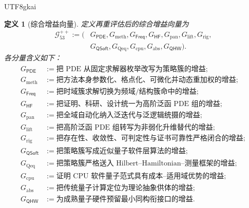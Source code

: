 \documentclass[12pt]{article}
\newtheorem{definition}{定义}[section]
\newcommand{\PDE}{\mathsf{PDE}}
\newcommand{\Freq}{\mathsf{Freq}}
\newcommand{\HF}{\mathsf{HF}}
\newcommand{\QSoft}{\mathsf{QSoft}}
\newcommand{\QHW}{\mathsf{QHW}}
\begin{document}
\begin{CJK*}{UTF8}{gkai}
\begin{definition}[综合增益向量]
定义再重评估后的综合增益向量为
\[
  \begin{aligned}
  \mathcal G_{53}^{++}
  :=
  (&
    G_{\PDE},
    G_{\mathrm{meth}},
    G_{\Freq},
    G_{\HF},
    G_{\mathrm{pan}},
    G_{\mathrm{lift}},
    G_{\mathrm{rig}},\\
   &
    G_{\QSoft},
    G_{\mathrm{Qeq}},
    G_{\mathrm{cpu}},
    G_{\mathrm{abs}},
    G_{\QHW}
  ).
  \end{aligned}
\]
各分量含义如下：
\[
\begin{aligned}
  G_{\PDE}
  &:=
  \text{把 PDE 从固定求解器枚举改写为策略簇的增益};\\
  G_{\mathrm{meth}}
  &:=
  \text{把方法本身参数化、格点化、可微化并动态重加权的增益};\\
  G_{\Freq}
  &:=
  \text{把时域簇求解切换为频域/结构簇命中的增益};\\
  G_{\HF}
  &:=
  \text{把证明、科研、设计统一为高阶泛函 PDE 组的增益};\\
  G_{\mathrm{pan}}
  &:=
  \text{把全域自动化纳入泛迭代与泛逻辑统摄的增益};\\
  G_{\mathrm{lift}}
  &:=
  \text{把高阶泛函 PDE 组转写为非弱化升维替代的增益};\\
  G_{\mathrm{rig}}
  &:=
  \text{把存在性、收敛性、可判定性与证书可靠性严格闭合的增益};\\
  G_{\QSoft}
  &:=
  \text{把策略簇写成近似量子软件层算法的增益};\\
  G_{\mathrm{Qeq}}
  &:=
  \text{把策略簇严格送入 Hilbert--Hamiltonian--测量框架的增益};\\
  G_{\mathrm{cpu}}
  &:=
  \text{证明 CPU 软件量子范式具有成本--适用域优势的增益};\\
  G_{\mathrm{abs}}
  &:=
  \text{把传统量子计算定位为理论抽象供体的增益};\\
  G_{\QHW}
  &:=
  \text{为成熟量子硬件预留最小同构衔接口的增益}.
\end{aligned}
\]
\end{definition}


\end{CJK*}
\end{document}
